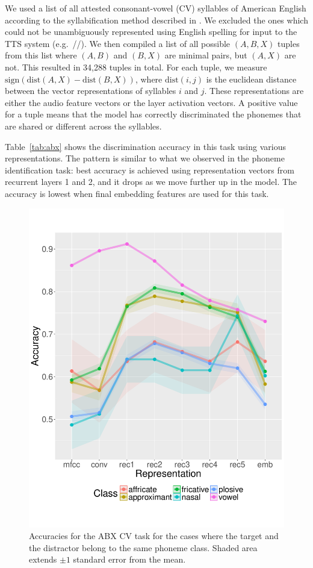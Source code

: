 We used a list of all attested consonant-vowel (CV) syllables of American English according to 
the syllabification method described in \citet{Gorman2013}. We excluded the ones which could 
not be unambiguously represented using English spelling for input to the TTS system 
(e.g.\ //). We then compiled a list of all possible $(A, B, X)$ tuples from this list 
where $(A,B)$ and $(B,X)$ are minimal pairs, but $(A,X)$ are not. 
This resulted in 34,288 tuples in total. For each tuple, we measure 
$\mathrm{sign}(\mathrm{dist}(A,X) - \mathrm{dist}(B,X))$, where $\mathrm{dist}(i,j)$ is the 
euclidean distance between the vector 
representations of syllables $i$ and $j$. These representations are either the audio feature 
vectors or the layer activation vectors. A positive value for a tuple means that the model has 
correctly discriminated the phonemes that are shared or different across the syllables.

Table~\ref{tab:abx} shows the discrimination accuracy in this task using various representations. 
The pattern is similar to what we observed in the phoneme identification task: best accuracy is 
achieved using representation vectors from recurrent layers 1 and 2, and it drops as we move 
further up in the model. The accuracy is lowest when final embedding features are used for this task. 




\begin{figure}[t]
  \centering
  \vskip -0.35cm
  \includegraphics[scale=0.3]{figures/abx_cv_same.pdf}
  \caption{Accuracies for the ABX CV task for the cases where the target
    and the distractor belong to the same phoneme class. Shaded area
    extends $\pm1$ standard error from the mean.}
  \label{fig:abx_cv_same}
\end{figure}

